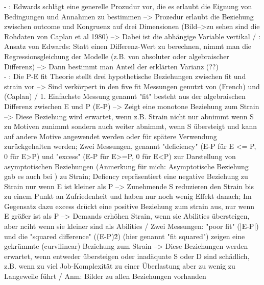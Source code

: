 - \cite[S. 15f.]{caplan:1993}: Edwards schlägt eine generelle Prozudur vor, die es erlaubt die Eignung von Bedingungen und Annahmen zu bestimmen --> Prozedur erlaubt die Beziehung zwischen outcome und Kongruenz auf drei Dimensionen (Bild-->zu sehen sind die Rohdaten von Caplan et al 1980) --> Dabei ist die abhängige Variable vertikal / \cite[S. 16]{caplan:1993}: Ansatz von Edwards: Statt einen Differenz-Wert zu berechnen, nimmt man die Regressionsgleichung der Modelle (z.B. von absoluter oder algebraischer Differenz) --> Dann bestimmt man Anteil der erklärten Varianz (??)\\
- \cite[S. 2]{edwards:1993}: Die P-E fit Theorie stellt drei hypothetische Beziehungen zwischen fit und strain vor --> Sind verkörpert in den five fit Messungen genutzt von (French) und (Caplan) / 1. Einfachste Messung genannt "fit" besteht aus der algebraischen Differenz zwischen E und P (E-P) --> Zeigt eine monotone Beziehung zum Strain --> Diese Beziehung wird erwartet, wenn z.B. Strain nicht nur abnimmt wenn S zu Motiven zunimmt sondern auch weiter abnimmt, wenn S übersteigt und kann auf andere Motive angewendet werden oder für spätere Verwendung zurückgehalten werden; Zwei Messungen, genannt "deficiency" (E-P für E <= P, 0 für E>P) und "excess" (E-P für E>=P, 0 für E<P) zur Darstellung von asymptotischen Beziehungen (Anmerkung für mich: Asymptotische Beziehung gab es auch bei \cite{edwards:1996}) zu Strain; Defiency repräsentiert eine negative Beziehung zu Strain nur wenn E ist kleiner als P --> Zunehmende S reduzieren den Strain bis zu einem Punkt an Zufriedenheit und haben nur noch wenig Effekt danach; Im Gegensatz dazu excess drückt eine positive Beziehung zum strain aus, nur wenn E größer ist als P --> Demands erhöhen Strain, wenn sie Abilities übersteigen, aber nciht wenn sie kleiner sind als Abilities / Zwei Messungen: "poor fit" (|E-P|) und die "squared difference" ((E-P)\^2) (hier genannt "fit squared") zeigen eine gekrümmte (curvilinear) Beziehung zum Strain --> Diese Beziehungen werden erwartet, wenn entweder übersteigen oder inadäquate S oder D sind schädlich, z.B. wenn zu viel Job-Komplexität zu einer Überlastung aber zu wenig zu Langeweile führt / Anm: Bilder zu allen Beziehungen vorhanden \\
